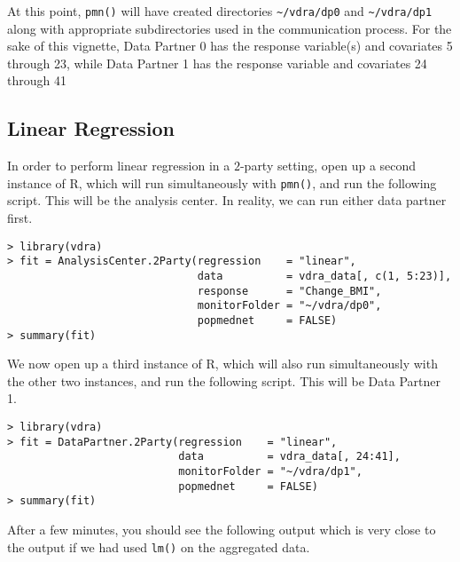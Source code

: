 \documentclass[12]{article}
\begin{document}
At this point, \verb"pmn()" will have created directories \verb"~/vdra/dp0" and \verb"~/vdra/dp1" along with appropriate subdirectories used in the communication process.  For the sake of this vignette, Data Partner 0 has the response variable(s) and covariates 5 through 23, while Data Partner 1 has the response variable and covariates 24 through 41

\subsection{Linear Regression}

In order to perform linear regression in a $2$-party setting, open up a second instance of R, which will run simultaneously with \verb"pmn()", and run the following script.  This will be the analysis center.  In reality, we can run either data partner first.

\begin{verbatim}
> library(vdra)
> fit = AnalysisCenter.2Party(regression    = "linear",
                              data          = vdra_data[, c(1, 5:23)],
                              response      = "Change_BMI",
                              monitorFolder = "~/vdra/dp0",
                              popmednet     = FALSE)
> summary(fit)
\end{verbatim}

We now open up a third instance of R, which will also run simultaneously with the other two instances, and run the following script.  This will be Data Partner 1.

\begin{verbatim}
> library(vdra)
> fit = DataPartner.2Party(regression    = "linear",
                           data          = vdra_data[, 24:41],
                           monitorFolder = "~/vdra/dp1",
                           popmednet     = FALSE)
> summary(fit)
\end{verbatim}

After a few minutes, you should see the following output which is very close to the output if we had used \verb"lm()" on the aggregated data.
\end{document}
